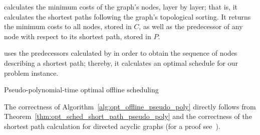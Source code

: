  calculates the minimum costs of the graph's nodes, layer by layer; that is, it calculates the shortest paths following the graph's topological sorting. It returns the minimum costs to all nodes, stored in $C$, as well as the predecessor of any node with respect to its shortest path, stored in $P$.

 uses the predecessors calculated by  in order to obtain the sequence of nodes describing a shortest path; thereby, it calculates an optimal schedule for our problem instance.

\begin{algorithm}[ht]
  \caption{Pseudo-polynomial-time optimal offline scheduling}
  \begin{algorithmic}[1]
	  \State \Return{$\mx$}
  \EndFunction
  \Statex
	\Statex {}
	\EndFor
		\EndFor
	\EndFor
	\State {}
  \EndFunction
  \Statex
	\EndFor
	\State \Return{$\mx$}
  \EndFunction
  \end{algorithmic}
\label{alg:opt_offline_pseudo_poly}
\end{algorithm}
The correctness of Algorithm~\ref{alg:opt_offline_pseudo_poly} directly follows from Theorem~\ref{thm:opt_sched_short_path_pseudo_poly} and the correctness of the shortest path calculation for directed acyclic graphs (for a proof see~\parencite[Section~24.2]{intro-algo}).

